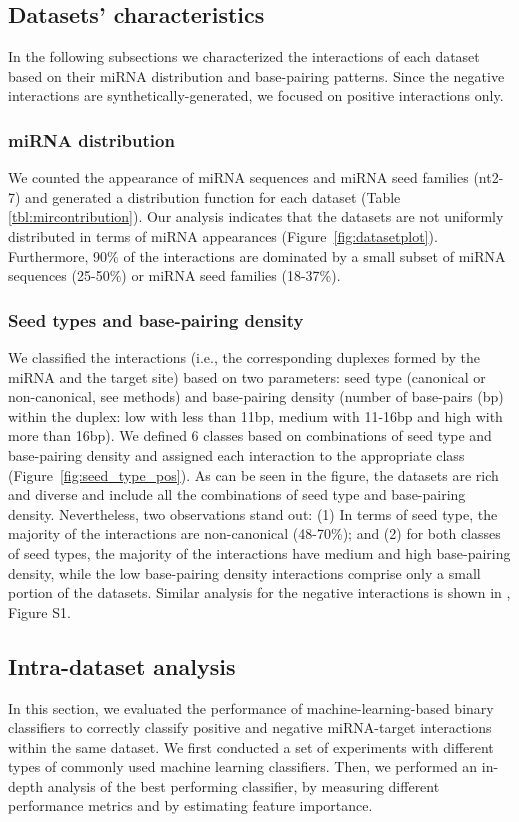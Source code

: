 \documentclass{bmcart}
\begin{document}
\subsection*{Datasets' characteristics}
In the following subsections we characterized the interactions of each dataset based on their miRNA distribution and base-pairing patterns. Since the negative interactions are synthetically-generated, we focused on positive interactions only.

\subsubsection*{miRNA distribution}
We counted the appearance of miRNA sequences and miRNA seed families (nt2-7) and generated a distribution function for each dataset (Table \ref{tbl:mircontribution}). Our analysis indicates that the datasets are not uniformly distributed in terms of miRNA appearances (Figure~\ref{fig:datasetplot}). Furthermore, 90\% of the interactions are dominated by a small subset of miRNA sequences (25-50\%) or miRNA seed families (18-37\%).




\subsubsection*{Seed types and base-pairing density}
We classified the interactions (i.e., the corresponding duplexes formed by the miRNA and the target site) based on two parameters: seed type (canonical or non-canonical, see methods) and base-pairing density (number of base-pairs (bp) within the duplex: low with less than 11bp, medium with 11-16bp and high with more than 16bp). We defined 6 classes based on combinations of seed type and base-pairing density and assigned each interaction to the appropriate class (Figure~\ref{fig:seed_type_pos}). As can be seen in the figure, the datasets are rich and diverse and include all the combinations of seed type and base-pairing density.
Nevertheless, two observations stand out: 
(1) In terms of seed type, the majority of the interactions are non-canonical (48-70\%); and (2) for both classes of seed types,  the majority of the interactions have medium and high base-pairing density, while the low base-pairing density interactions comprise only a small portion of the datasets. Similar analysis for the negative interactions is shown in , Figure S1.

\subsection*{Intra-dataset analysis} \label{nameref:indataset}
In this section, we evaluated the performance of machine-learning-based binary classifiers to correctly classify positive and negative miRNA-target interactions within the same dataset. 
We first conducted a set of experiments with different types of commonly used machine learning classifiers. Then, we performed an in-depth analysis of the best performing classifier, by measuring different performance metrics and by estimating feature importance.
\end{document}
